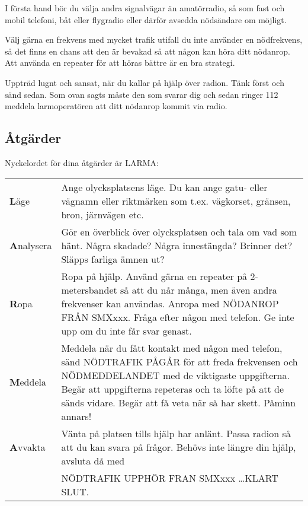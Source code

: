I första hand bör du välja andra signalvägar än amatörradio, så som fast och
mobil telefoni, båt eller flygradio eller därför avsedda nödsändare om möjligt.

Välj gärna en frekvens med mycket trafik utifall du inte använder en
nödfrekvens, så det finns en chans att den är bevakad så att någon kan höra
ditt nödanrop. Att använda en repeater för att höras bättre är en bra strategi.

Uppträd lugnt och sansat, när du kallar på hjälp över radion.
Tänk först och sänd sedan.
Som ovan sagts måste den som svarar dig och sedan ringer 112 meddela
larmoperatören att ditt nödanrop kommit via radio.

\subsection{Åtgärder}

Nyckelordet för dina åtgärder är LARMA:

\begin{tabular}{lp{9cm}}
	\textbf{L}äge &
        Ange olycksplatsens läge.
        Du kan ange gatu- eller vägnamn eller riktmärken som
        t.ex. vägkorset, gränsen, bron, järnvägen etc.
	\\
	\textbf{A}nalysera
	&
        Gör en överblick över olycksplatsen och tala om vad som hänt.
        Några skadade? Några innestängda?
        Brinner det? Släpps farliga ämnen ut?
	\\
	\textbf{R}opa &
        Ropa på hjälp.
        Använd gärna en repeater på 2-metersbandet så att du når många,
        men även andra frekvenser kan användas.
        Anropa med NÖDANROP FRÅN SMXxxx.
        Fråga efter någon med telefon.
        Ge inte upp om du inte får svar genast.
	\\
	\textbf{M}eddela &
        Meddela när du fått kontakt med någon med telefon, sänd NÖDTRAFIK PÅGÅR
        för att freda frekvensen och NÖDMEDDELANDET med de viktigaste
        uppgifterna.
        Begär att uppgifterna repeteras och ta löfte på att de sänds vidare.
        Begär att få veta när så har skett.
        Påminn annars!
	\\
	\textbf{A}vvakta &
        Vänta på platsen tills hjälp har anlänt.
        Passa radion så att du kan svara på frågor.
        Behövs inte längre din hjälp, avsluta då med\\
	& NÖDTRAFIK UPPHÖR FRAN SMXxxx \dots KLART SLUT.
\end{tabular}
